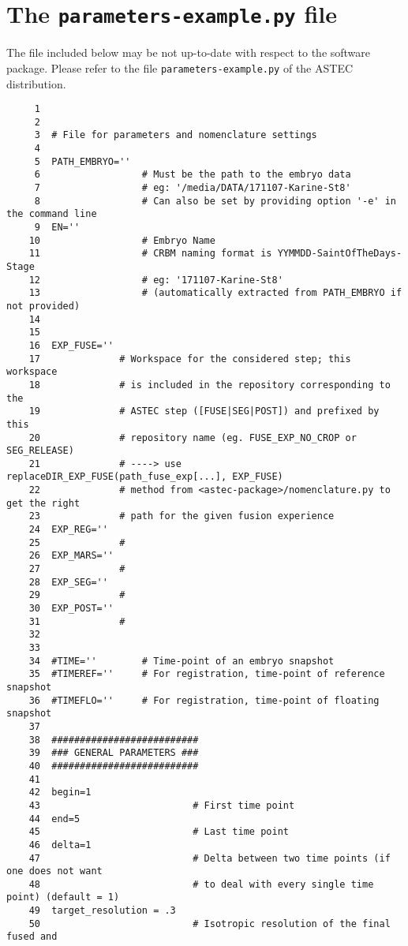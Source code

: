 \section{The \texttt{parameters-example.py} file}
\label{sec:parameters:original}

\begin{attention}
The file included below  may be not up-to-date with respect to the software package. Please refer to the file \texttt{parameters-example.py} of the ASTEC distribution.
\end{attention}

\begin{verbatim}
     1	
     2	
     3	# File for parameters and nomenclature settings
     4	
     5	PATH_EMBRYO=''	
     6	                # Must be the path to the embryo data 
     7					# eg: '/media/DATA/171107-Karine-St8'
     8					# Can also be set by providing option '-e' in the command line
     9	EN=''			
    10	                # Embryo Name 
    11	                # CRBM naming format is YYMMDD-SaintOfTheDays-Stage
    12					# eg: '171107-Karine-St8'
    13					# (automatically extracted from PATH_EMBRYO if not provided)
    14	
    15	
    16	EXP_FUSE=''	
    17	            # Workspace for the considered step; this workspace
    18				# is included in the repository corresponding to the
    19				# ASTEC step ([FUSE|SEG|POST]) and prefixed by this
    20				# repository name (eg. FUSE_EXP_NO_CROP or SEG_RELEASE)
    21				# ----> use replaceDIR_EXP_FUSE(path_fuse_exp[...], EXP_FUSE) 
    22				# method from <astec-package>/nomenclature.py to get the right
    23				# path for the given fusion experience
    24	EXP_REG=''	
    25	            #
    26	EXP_MARS=''	
    27	            #
    28	EXP_SEG=''	
    29	            #
    30	EXP_POST=''	
    31	            #
    32	
    33	
    34	#TIME=''		# Time-point of an embryo snapshot 
    35	#TIMEREF=''		# For registration, time-point of reference snapshot
    36	#TIMEFLO=''		# For registration, time-point of floating snapshot
    37	
    38	##########################
    39	### GENERAL PARAMETERS ###
    40	##########################
    41	
    42	begin=1 				 
    43	                         # First time point
    44	end=5   				 
    45	                         # Last time point
    46	delta=1     			 
    47	                         # Delta between two time points (if one does not want
    48							 # to deal with every single time point) (default = 1)
    49	target_resolution = .3   
    50	                         # Isotropic resolution of the final fused and 

\end{verbatim}

